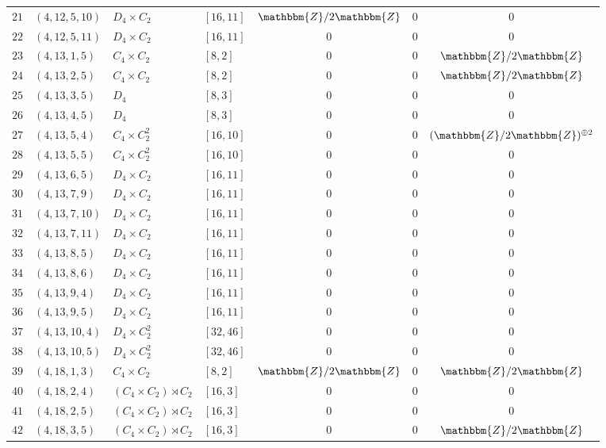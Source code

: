 \documentclass{amsart}
\theoremstyle{plain}
\theoremstyle{definition}
\theoremstyle{remark}
\newcommand{\bZ}{\mathbbm{Z}}\newcommand{\bQ}{\mathbbm{Q}}
\begin{document}
{\begin{longtable}{llll|ccc}
$21$ & $( 4, 12, 5, 10 )$ & $D_4\times C_2$ & $[ 16, 11 ]$& $\bZ/2\bZ$ & $0$ & $0$\\
$22$ & $( 4, 12, 5, 11 )$ & $D_4\times C_2$ & $[ 16, 11 ]$& $0$ & $0$ & $0$\\
$23$ & $( 4, 13, 1, 5 )$ & $C_4 \times C_2$ & $[ 8, 2 ]$& $0$ & $0$ & $\bZ/2\bZ$\\
$24$ & $( 4, 13, 2, 5 )$ & $C_4 \times C_2$ & $[ 8, 2 ]$& $0$ & $0$ & $\bZ/2\bZ$\\
$25$ & $( 4, 13, 3, 5 )$ & $D_4$ & $[ 8, 3 ]$& $0$ & $0$ & $0$\\
$26$ & $( 4, 13, 4, 5 )$ & $D_4$ & $[ 8, 3 ]$& $0$ & $0$ & $0$\\
$27$ & $( 4, 13, 5, 4 )$ & $C_4 \times C_2^2$ & $[ 16, 10 ]$& $0$ & $0$ & $(\bZ/2\bZ)^{\oplus 2}$\\
$28$ & $( 4, 13, 5, 5 )$ & $C_4 \times C_2^2$ & $[ 16, 10 ]$& $0$ & $0$ & $0$\\
$29$ & $( 4, 13, 6, 5 )$ & $D_4\times C_2$ & $[ 16, 11 ]$& $0$ & $0$ & $0$\\
$30$ & $( 4, 13, 7, 9 )$ & $D_4\times C_2$ & $[ 16, 11 ]$& $0$ & $0$ & $0$\\
$31$ & $( 4, 13, 7, 10 )$ & $D_4\times C_2$ & $[ 16, 11 ]$& $0$ & $0$ & $0$\\
$32$ & $( 4, 13, 7, 11 )$ & $D_4\times C_2$ & $[ 16, 11 ]$& $0$ & $0$ & $0$\\
$33$ & $( 4, 13, 8, 5 )$ & $D_4\times C_2$ & $[ 16, 11 ]$& $0$ & $0$ & $0$\\
$34$ & $( 4, 13, 8, 6 )$ & $D_4\times C_2$ & $[ 16, 11 ]$& $0$ & $0$ & $0$\\
$35$ & $( 4, 13, 9, 4 )$ & $D_4\times C_2$ & $[ 16, 11 ]$& $0$ & $0$ & $0$\\
$36$ & $( 4, 13, 9, 5 )$ & $D_4\times C_2$ & $[ 16, 11 ]$& $0$ & $0$ & $0$\\
$37$ & $( 4, 13, 10, 4 )$ & $D_4\times C_2^2$ & $[ 32, 46 ]$& $0$ & $0$ & $0$\\
$38$ & $( 4, 13, 10, 5 )$ & $D_4\times C_2^2$ & $[ 32, 46 ]$& $0$ & $0$ & $0$\\
$39$ & $( 4, 18, 1, 3 )$ & $C_4 \times C_2$ & $[ 8, 2 ]$& $\bZ/2\bZ$ & $0$ & $\bZ/2\bZ$\\
$40$ & $( 4, 18, 2, 4 )$ & $(C_4 \times C_2) \rtimes C_2$ & $[ 16, 3 ]$& $0$ & $0$ & $0$\\
$41$ & $( 4, 18, 2, 5 )$ & $(C_4 \times C_2) \rtimes C_2$ & $[ 16, 3 ]$& $0$ & $0$ & $0$\\
$42$ & $( 4, 18, 3, 5 )$ & $(C_4 \times C_2) \rtimes C_2$ & $[ 16, 3 ]$& $0$ & $0$ & $\bZ/2\bZ$\\

\end{longtable}}
\end{document}
